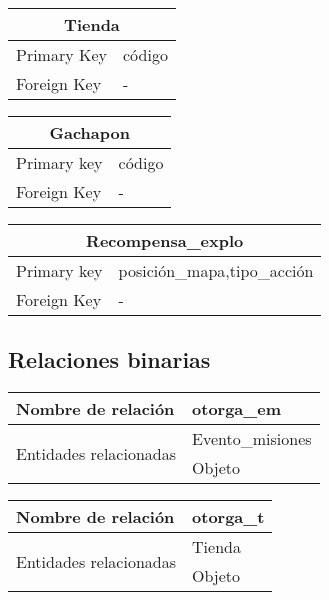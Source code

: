 \documentclass{report}
\begin{document}
\begin{center}    
    \begin{tabular}{|p{3cm}|p{5cm}|}
    \hline
    \multicolumn{2}{|c|}{Tienda} \\ 
    \hline
    \hline
    Primary Key& código\\ 
    \hline
    Foreign Key &-\\ 
    \hline
    \end{tabular}
\end{center}

\begin{center}    
    \begin{tabular}{|p{3cm}|p{5cm}|}
    \hline
    \multicolumn{2}{|c|}{Gachapon} \\ 
    \hline
    \hline
    Primary key&código\\
    \hline
    Foreign Key &-\\ 
    \hline
    \end{tabular}
\end{center}

\begin{center}    
    \begin{tabular}{|p{3cm}|p{5cm}|}
    \hline
    \multicolumn{2}{|c|}{Recompensa\_explo} \\ 
    \hline
    \hline
    Primary key&posición\_mapa,tipo\_acción\\
    \hline
    Foreign Key &-\\ 
    \hline
    \end{tabular}
\end{center}

\subsection{Relaciones binarias}

\begin{center}    
    \begin{tabular}{|p{3cm}|p{5cm}|}
    \hline
    Nombre de relación& otorga\_em\\ 
    \hline
    \hline
    \multirow{2}{6em}{Entidades relacionadas}&Evento\_misiones \\ &Objeto\\ 
    \hline
    \end{tabular}
\end{center}

\begin{center}    
    \begin{tabular}{|p{3cm}|p{5cm}|}
    \hline
    Nombre de relación& otorga\_t\\ 
    \hline
    \hline
    \multirow{2}{6em}{Entidades relacionadas}& Tienda \\ &Objeto\\ 
    \hline
    \end{tabular}
\end{center}
\end{document}
